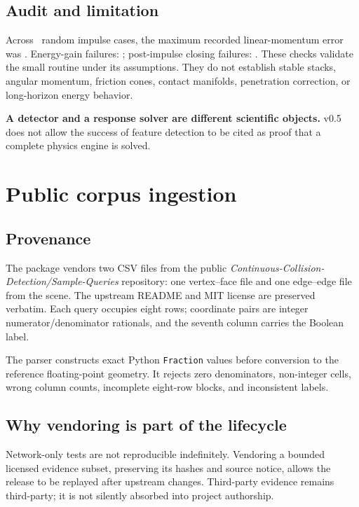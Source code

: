 \documentclass[11pt,a4paper,oneside]{book}
\newcommand{\risk}[1]{\textcolor{riskred}{\textbf{#1}}}
\begin{document}
\section{Audit and limitation}

Across \ResponseSamples\ random impulse cases, the maximum recorded linear-momentum error was \ResponseMomentumError. Energy-gain failures: \ResponseEnergyFailures; post-impulse closing failures: \ResponseClosingFailures. These checks validate the small routine under its assumptions. They do not establish stable stacks, angular momentum, friction cones, contact manifolds, penetration correction, or long-horizon energy behavior.

\risk{A detector and a response solver are different scientific objects.} v0.5 does not allow the success of feature detection to be cited as proof that a complete physics engine is solved.

\chapter{Public corpus ingestion}
\section{Provenance}

The package vendors two CSV files from the public \emph{Continuous-Collision-Detection/Sample-Queries} repository: one vertex--face file and one edge--edge file from the  scene. The upstream README and MIT license are preserved verbatim. Each query occupies eight rows; coordinate pairs are integer numerator/denominator rationals, and the seventh column carries the Boolean label.

The parser constructs exact Python \texttt{Fraction} values before conversion to the reference floating-point geometry. It rejects zero denominators, non-integer cells, wrong column counts, incomplete eight-row blocks, and inconsistent labels.

\section{Why vendoring is part of the lifecycle}

Network-only tests are not reproducible indefinitely. Vendoring a bounded licensed evidence subset, preserving its hashes and source notice, allows the release to be replayed after upstream changes. Third-party evidence remains third-party; it is not silently absorbed into project authorship.
\end{document}
